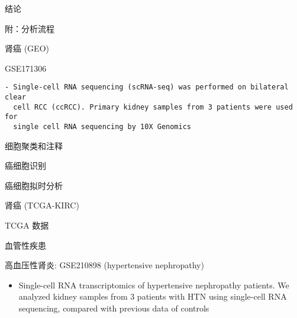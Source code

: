 \documentclass[
  ignorenonframetext,
]{beamer}
\providecommand{\tightlist}{%
  \setlength{\itemsep}{0pt}\setlength{\parskip}{0pt}}
\begin{document}
\begin{frame}{结论}
\protect\hypertarget{dis}{}
\end{frame}

\begin{frame}[fragile]{附：分析流程}
\protect\hypertarget{ux9644ux5206ux6790ux6d41ux7a0b}{}
\begin{block}{肾癌 (GEO)}
\protect\hypertarget{ux80beux764c-geo}{}
\begin{block}{GSE171306}
\protect\hypertarget{gse171306}{}
\begin{verbatim}
- Single-cell RNA sequencing (scRNA-seq) was performed on bilateral clear
  cell RCC (ccRCC). Primary kidney samples from 3 patients were used for
  single cell RNA sequencing by 10X Genomics
\end{verbatim}

\begin{block}{细胞聚类和注释}
\protect\hypertarget{ux7ec6ux80deux805aux7c7bux548cux6ce8ux91ca}{}
\end{block}

\begin{block}{癌细胞识别}
\protect\hypertarget{ux764cux7ec6ux80deux8bc6ux522b}{}
\end{block}

\begin{block}{癌细胞拟时分析}
\protect\hypertarget{ux764cux7ec6ux80deux62dfux65f6ux5206ux6790}{}
\end{block}
\end{block}
\end{block}

\begin{block}{肾癌 (TCGA-KIRC)}
\protect\hypertarget{ux80beux764c-tcga-kirc}{}
\begin{block}{TCGA 数据}
\protect\hypertarget{tcga-ux6570ux636e}{}
\end{block}
\end{block}

\begin{block}{血管性疾患}
\protect\hypertarget{ux8840ux7ba1ux6027ux75beux60a3}{}
\begin{block}{高血压性肾炎: GSE210898 (hypertensive nephropathy)}
\protect\hypertarget{ux9ad8ux8840ux538bux6027ux80beux708e-gse210898-hypertensive-nephropathy}{}
\begin{itemize}
\tightlist
\item
  Single-cell RNA transcriptomics of hypertensive nephropathy patients.
  We analyzed kidney samples from 3 patients with HTN using single-cell
  RNA sequencing, compared with previous data of controls
\end{itemize}


\end{block}
\end{block}
\end{frame}
\end{document}
